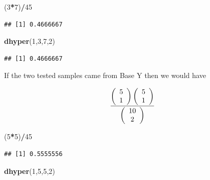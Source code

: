 \documentclass[]{book}
\newenvironment{Shaded}{\begin{snugshade}}{\end{snugshade}}
\newcommand{\KeywordTok}[1]{\textcolor[rgb]{0.13,0.29,0.53}{\textbf{#1}}}
\newcommand{\DecValTok}[1]{\textcolor[rgb]{0.00,0.00,0.81}{#1}}
\newcommand{\OperatorTok}[1]{\textcolor[rgb]{0.81,0.36,0.00}{\textbf{#1}}}
\newcommand{\NormalTok}[1]{#1}
\theoremstyle{definition}
\theoremstyle{definition}
\theoremstyle{definition}
\theoremstyle{remark}
\begin{document}
\begin{Shaded}
\begin{Highlighting}[]
\NormalTok{(}\DecValTok{3}\OperatorTok{*}\DecValTok{7}\NormalTok{)}\OperatorTok{/}\DecValTok{45}
\end{Highlighting}
\end{Shaded}

\begin{verbatim}
## [1] 0.4666667
\end{verbatim}

\begin{Shaded}
\begin{Highlighting}[]
\KeywordTok{dhyper}\NormalTok{(}\DecValTok{1}\NormalTok{,}\DecValTok{3}\NormalTok{,}\DecValTok{7}\NormalTok{,}\DecValTok{2}\NormalTok{)}
\end{Highlighting}
\end{Shaded}

\begin{verbatim}
## [1] 0.4666667
\end{verbatim}

If the two tested samples came from Base Y then we would have

\[{\left( \begin{array}{c} 5 \\ 1 \end{array} \right) \left( \begin{array}{c} 5 \\ 1 \end{array} \right) \over \left( \begin{array}{c} 10 \\ 2 \end{array} \right)}\]

\begin{Shaded}
\begin{Highlighting}[]
\NormalTok{(}\DecValTok{5}\OperatorTok{*}\DecValTok{5}\NormalTok{)}\OperatorTok{/}\DecValTok{45}
\end{Highlighting}
\end{Shaded}

\begin{verbatim}
## [1] 0.5555556
\end{verbatim}

\begin{Shaded}
\begin{Highlighting}[]
\KeywordTok{dhyper}\NormalTok{(}\DecValTok{1}\NormalTok{,}\DecValTok{5}\NormalTok{,}\DecValTok{5}\NormalTok{,}\DecValTok{2}\NormalTok{)}
\end{Highlighting}
\end{Shaded}
\end{document}

